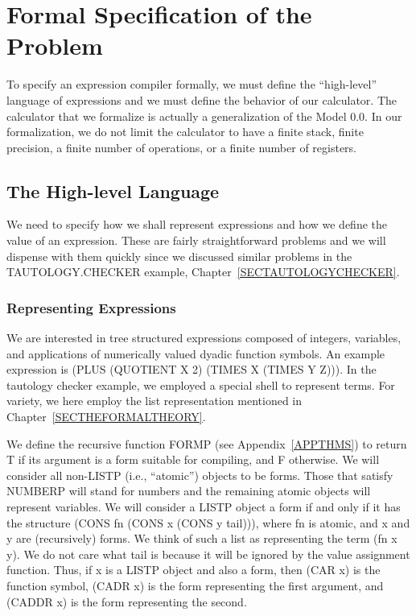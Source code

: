 \documentclass[10pt]{book}
\begin{document}
\section{Formal Specification of the Problem}
To specify an expression compiler
formally, we must define the ``high-level'' language
of expressions and we must define the
behavior of our calculator.  The calculator
that we formalize is actually a generalization
of the Model 0.0.  In our formalization, we
do not limit the calculator to have a finite
stack, finite precision, a finite number
of operations, or a finite number of registers.

\subsection{The High-level Language}
We need to specify how we shall represent expressions
and how we define the value of an expression.
These are fairly straightforward problems and we will dispense
with them quickly since we discussed similar problems in the
TAUTOLOGY.CHECKER example, Chapter~\ref{SECTAUTOLOGYCHECKER}.

\subsubsection{Representing Expressions}
We are interested in tree structured 
expressions composed of integers, variables, and
applications of numerically valued dyadic function symbols.
An example expression is (PLUS (QUOTIENT X 2) (TIMES X (TIMES Y Z))).
In the tautology checker example, we employed a special shell to represent
terms.  For variety, we here employ the list representation
mentioned in Chapter~\ref{SECTHEFORMALTHEORY}.

We define the recursive function FORMP (see Appendix~\ref{APPTHMS}) to return T if its
argument is a form suitable for compiling, and F otherwise.
We will consider all non-LISTP (i.e., ``atomic'') objects to be forms.  Those that satisfy NUMBERP
will stand for numbers and the remaining atomic objects will represent variables.
We will consider a LISTP object a form if and only if it has the structure
(CONS fn (CONS x (CONS y tail))), where fn is atomic, and x and y are
(recursively) forms.  We think of such a list as representing the
term (fn x y).  We do not care what tail is because it will be
ignored by the value assignment function.
Thus, if x is a LISTP object and
also a form, then (CAR x) is the function symbol, (CADR x) is the form representing
the first argument, and (CADDR x) is the form representing the second.
\end{document}
